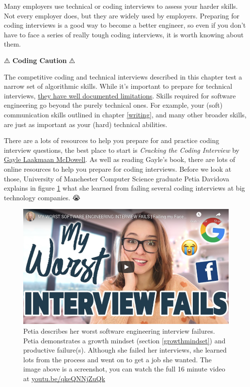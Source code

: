 \documentclass[
]{book}
\begin{document}
Many employers use technical or coding interviews to assess your harder skills. Not every employer does, but they are widely used by employers. Preparing for coding interviews is a good way to become a better engineer, so even if you don't have to face a series of really tough coding interviews, it is worth knowing about them.

⚠️ \textbf{Coding Caution} ⚠️

The competitive coding and technical interviews described in this chapter test a narrow set of algorithmic skills. While it's important to prepare for technical interviews, \href{https://www.quora.com/What-are-some-common-criticisms-of-Cracking-the-Coding-interview}{they have well documented limitations}. \citep{murashenkov} Skills required for software engineering go beyond the purely technical ones. For example, your (soft) communication skills outlined in chapter \ref{writing}, and many other broader skills, are just as important as your (hard) technical abilities.

There are a lots of resources to help you prepare for and practice coding interview questions, the best place to start is \emph{Cracking the Coding Interview} by \href{https://en.wikipedia.org/wiki/Gayle_Laakmann_McDowell}{Gayle Laakmaan McDowell}. \citep{cracking} As well as reading Gayle's book, there are lots of online resources to help you prepare for coding interviews. Before we look at those, University of Manchester Computer Science graduate Petia Davidova explains in figure \ref{fig:petia-fig} what she learned from failing several coding interviews at big technology companies. 😭

\begin{figure}

{\centering \includegraphics[width=0.99\linewidth]{images/youtube-petia} 

}

\caption{Petia describes her worst software engineering interview failures. \citep{youtube-petia} Petia demonstrates a growth mindset (section \ref{growthmindset}) and productive failure(s). Although she failed her interviews, she learned lots from the process and went on to get a job she wanted. The image above is a screenshot, you can watch the full 16 minute video at \href{https://youtu.be/qkeQNNjZuQk}{youtu.be/qkeQNNjZuQk}}\label{fig:petia-fig}
\end{figure}
\end{document}
